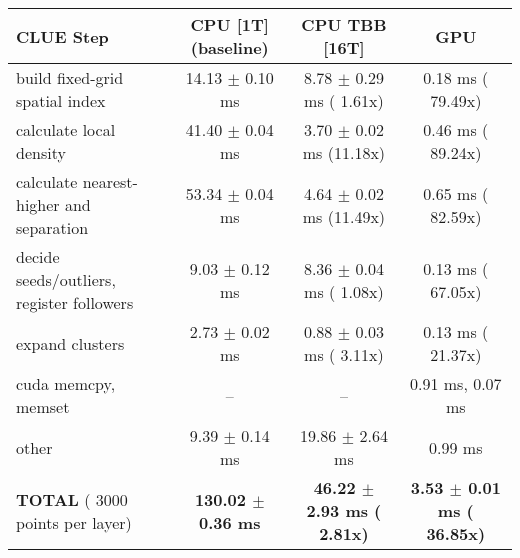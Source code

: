     \begin{tabular}{l|c|c|c}
    \hline
    CLUE Step                                 & CPU [1T] (baseline)         & CPU TBB [16T]                         & GPU                       \\ \hline
    build fixed-grid spatial index            &  14.13 $\pm$  0.10 ms       &   8.78 $\pm$  0.29 ms ( 1.61x)        &   0.18 ms ( 79.49x)       \\
    calculate local density                   &  41.40 $\pm$  0.04 ms       &   3.70 $\pm$  0.02 ms (11.18x)        &   0.46 ms ( 89.24x)       \\
    calculate nearest-higher and separation   &  53.34 $\pm$  0.04 ms       &   4.64 $\pm$  0.02 ms (11.49x)        &   0.65 ms ( 82.59x)       \\
    decide seeds/outliers, register followers &   9.03 $\pm$  0.12 ms       &   8.36 $\pm$  0.04 ms ( 1.08x)        &   0.13 ms ( 67.05x)       \\
    expand clusters                           &   2.73 $\pm$  0.02 ms       &   0.88 $\pm$  0.03 ms ( 3.11x)        &   0.13 ms ( 21.37x)       \\ \hline
    cuda memcpy, memset                       & --                          & --                                    &   0.91 ms,   0.07 ms      \\ 
    other                                     &   9.39 $\pm$  0.14 ms       &  19.86 $\pm$  2.64 ms                 &   0.99 ms                 \\ \hline
    \textbf{TOTAL} ( 3000 points per layer)   & \textbf{130.02 $\pm$  0.36 ms} & \textbf{ 46.22 $\pm$  2.93 ms ( 2.81x)} & \textbf{  3.53 $\pm$  0.01 ms ( 36.85x)}  \\
    \hline 
    \end{tabular}
    \linebreak


